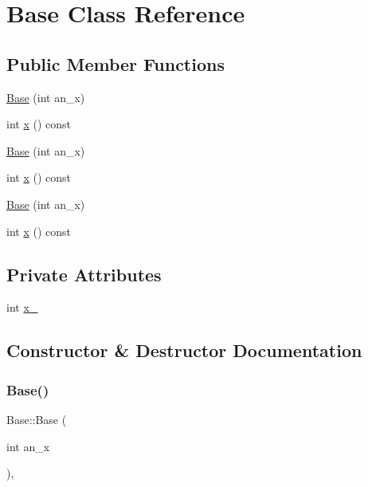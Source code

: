 \hypertarget{class_base}{}\section{Base Class Reference}
\label{class_base}
\subsection*{Public Member Functions}
\begin{DoxyCompactItemize}
\item 
\mbox{\hyperlink{class_base_a1d5f3fb92f8cbc687705785bdc6abd18}{Base}} (int an\+\_\+x)
\item 
int \mbox{\hyperlink{class_base_a779fd2b157ebd763b15383d96047e07c}{x}} () const
\item 
\mbox{\hyperlink{class_base_a1d5f3fb92f8cbc687705785bdc6abd18}{Base}} (int an\+\_\+x)
\item 
int \mbox{\hyperlink{class_base_a779fd2b157ebd763b15383d96047e07c}{x}} () const
\item 
\mbox{\hyperlink{class_base_a1d5f3fb92f8cbc687705785bdc6abd18}{Base}} (int an\+\_\+x)
\item 
int \mbox{\hyperlink{class_base_a779fd2b157ebd763b15383d96047e07c}{x}} () const
\end{DoxyCompactItemize}
\subsection*{Private Attributes}
\begin{DoxyCompactItemize}
\item 
int \mbox{\hyperlink{class_base_a52a6455160a570c261fe257b5d785707}{x\+\_\+}}
\end{DoxyCompactItemize}


\subsection{Constructor \& Destructor Documentation}
\mbox{\label{class_base_a1d5f3fb92f8cbc687705785bdc6abd18}} 
\subsubsection{\texorpdfstring{Base()}{Base()}\hspace{0.1cm}{\footnotesize\ttfamily [1/3]}}
{\footnotesize\ttfamily Base\+::\+Base (\begin{DoxyParamCaption}\item[{int}]{an\+\_\+x }\end{DoxyParamCaption})\hspace{0.3cm}{\ttfamily [inline]}, {\ttfamily [explicit]}}

